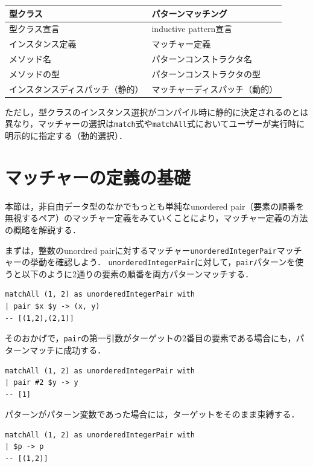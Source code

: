 \medskip
\begin{center}
\begin{tabular}{ll}
\hline
\textbf{型クラス} & \textbf{パターンマッチング} \\
\hline
型クラス宣言 & inductive pattern宣言 \\
インスタンス定義 & マッチャー定義 \\
メソッド名 & パターンコンストラクタ名 \\
メソッドの型 & パターンコンストラクタの型 \\
インスタンスディスパッチ（静的） & マッチャーディスパッチ（動的） \\
\hline
\end{tabular}
\end{center}
\medskip

ただし，型クラスのインスタンス選択がコンパイル時に静的に決定されるのとは異なり，マッチャーの選択は\lstinline{match}式や\lstinline{matchAll}式においてユーザーが実行時に明示的に指定する（動的選択）．

\section{マッチャーの定義の基礎}\label{matcher-basic}

本節は，非自由データ型のなかでもっとも単純なunordered pair（要素の順番を無視するペア）のマッチャー定義をみていくことにより，マッチャー定義の方法の概略を解説する．

まずは，整数のunordred pairに対するマッチャー\lstinline{unorderedIntegerPair}マッチャーの挙動を確認しよう．
\lstinline{unorderedIntegerPair}に対して，\lstinline{pair}パターンを使うと以下のように2通りの要素の順番を両方パターンマッチする．
\begin{lstlisting}[language=egison,numbers=none]
matchAll (1, 2) as unorderedIntegerPair with
| pair $x $y -> (x, y)
-- [(1,2),(2,1)]
\end{lstlisting}
そのおかげで，\lstinline{pair}の第一引数がターゲットの2番目の要素である場合にも，パターンマッチに成功する．
\begin{lstlisting}[language=egison,numbers=none]
matchAll (1, 2) as unorderedIntegerPair with
| pair #2 $y -> y
-- [1]
\end{lstlisting}
パターンがパターン変数であった場合には，ターゲットをそのまま束縛する．
\begin{lstlisting}[language=egison,numbers=none]
matchAll (1, 2) as unorderedIntegerPair with
| $p -> p
-- [(1,2)]
\end{lstlisting}

